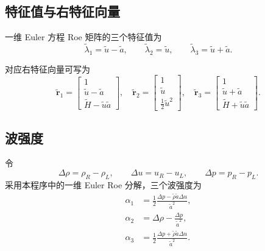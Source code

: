 \subsection{特征值与右特征向量}

一维 Euler 方程 Roe 矩阵的三个特征值为
\begin{equation}
    \tilde\lambda_1=\tilde u-\tilde a,
    \qquad
    \tilde\lambda_2=\tilde u,
    \qquad
    \tilde\lambda_3=\tilde u+\tilde a.
\end{equation}

对应右特征向量可写为
\begin{equation}
    \tilde{\bm r}_1
    =
    \begin{bmatrix}
        1\\
        \tilde u-\tilde a\\
        \tilde H-\tilde u\tilde a
    \end{bmatrix},
    \quad
    \tilde{\bm r}_2
    =
    \begin{bmatrix}
        1\\
        \tilde u\\
        \frac{1}{2}\tilde u^2
    \end{bmatrix},
    \quad
    \tilde{\bm r}_3
    =
    \begin{bmatrix}
        1\\
        \tilde u+\tilde a\\
        \tilde H+\tilde u\tilde a
    \end{bmatrix}.
\end{equation}

\subsection{波强度}

令
\begin{equation}
    \Delta \rho = \rho_R-\rho_L,
    \qquad
    \Delta u = u_R-u_L,
    \qquad
    \Delta p = p_R-p_L.
\end{equation}
采用本程序中的一维 Euler Roe 分解，三个波强度为
\begin{align}
    \alpha_1
    &=
    \frac{1}{2}
    \frac{
        \Delta p-\tilde\rho\tilde a\Delta u
    }{\tilde a^2},
    \\
    \alpha_2
    &=
    \Delta\rho-\frac{\Delta p}{\tilde a^2},
    \\
    \alpha_3
    &=
    \frac{1}{2}
    \frac{
        \Delta p+\tilde\rho\tilde a\Delta u
    }{\tilde a^2}.
\end{align}

